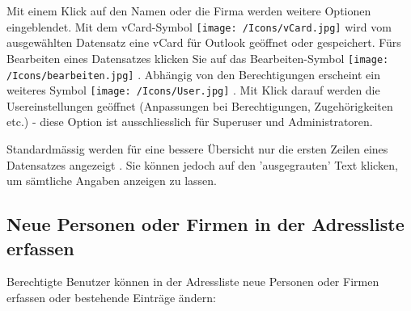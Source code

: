 \vspace{\baselineskip}

Mit einem Klick auf den Namen  oder die Firma werden weitere Optionen eingeblendet. Mit dem vCard-Symbol \texttt{[image: /Icons/vCard.jpg]}  wird vom ausgewählten Datensatz eine vCard für Outlook geöffnet oder gespeichert. Fürs Bearbeiten eines Datensatzes klicken Sie auf das Bearbeiten-Symbol \texttt{[image: /Icons/bearbeiten.jpg]} . Abhängig von den Berechtigungen erscheint ein weiteres Symbol \texttt{[image: /Icons/User.jpg]} . Mit Klick darauf werden die Usereinstellungen geöffnet (Anpassungen bei Berechtigungen, Zugehörigkeiten etc.) - diese Option ist ausschliesslich für Superuser und Administratoren.

\vspace{\baselineskip}

Standardmässig werden für eine bessere Übersicht nur die ersten Zeilen eines Datensatzes angezeigt . Sie können jedoch auf den 'ausgegrauten' Text klicken, um sämtliche Angaben anzeigen zu lassen.

\subsection{Neue Personen oder Firmen in der Adressliste erfassen}
\label{bkm:Ref2018071901}
Berechtigte Benutzer können in der Adressliste neue Personen oder Firmen erfassen oder bestehende Einträge ändern:

\vspace{\baselineskip}

